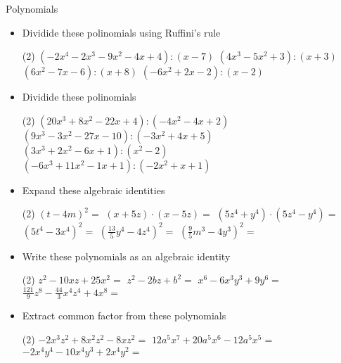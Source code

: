 \documentclass[a4paper]{article}
\begin{document}
     \begin{itemize}
  \begin{section}{Polynomials}
  \begin{itemize}
    \item Dividide these polinomials using Ruffini's rule
    \begin{tasks}(2)
      \task $\left(-2 x^{4} -2 x^{3} -9 x^{2} -4 x + 4 \right) : \left( x -7 \right)$
      \task $\left(4 x^{3} -5 x^{2}  + 3 \right) : \left( x + 3 \right)$
      \task $\left(6 x^{2} -7 x -6 \right) : \left( x + 8 \right)$
      \task $\left(-6 x^{2} + 2 x -2 \right) : \left( x -2 \right)$
    \end{tasks}
    \item Dividide these polinomials
    \begin{tasks}(2)
      \task $\left(20 x^{3} + 8 x^{2} -22 x + 4 \right) : \left(-4 x^{2} -4 x + 2 \right)$
      \task $\left(9 x^{3} -3 x^{2} -27 x -10 \right) : \left(-3 x^{2} + 4 x + 5 \right)$
      \task $\left(3 x^{3} + 2 x^{2} -6 x + 1 \right) : \left( x^{2}  -2 \right)$
      \task $\left(-6 x^{3} + 11 x^{2} -1 x + 1 \right) : \left(-2 x^{2} +  x + 1 \right)$
    \end{tasks}
    \item Expand these algebraic identities
    \begin{tasks}(2)
      \task $\left(t - 4 m\right)^2 = {}$
      \task $\left(x + 5 z\right) \cdot \left(x - 5 z\right) = {}$
      \task $\left(5 z^{4} + y^{4}\right) \cdot \left(5 z^{4} - y^{4}\right) = {}$
      \task $\left(5 t^{4} - 3 x^{4}\right)^2 = {}$
      \task $\left(\frac{13}{5} y^{4} - 4 z^{4}\right)^2 = {}$
      \task $\left(\frac{9}{5} m^{3} - 4 y^{3}\right)^2 = {}$
    \end{tasks}
    \item Write these polynomials as an algebraic identity
    \begin{tasks}(2)
      \task $z^{2} -10 x z +25 x^{2} = {}$
      \task $z^{2} -2 b z +b^{2} = {}$
      \task $x^{6} -6 x^{3} y^{3} +9 y^{6} = {}$
      \task $\frac{121}{9} z^{8} -\frac{44}{3} x^{4} z^{4} +4 x^{8} = {}$
    \end{tasks}
    \item Extract common factor from these polynomials
    \begin{tasks}(2)
      \task $-2 x^{3} z^{2} +8 x^{2} z^{2} -8 x z^{2} = {}$
      \task $12 a^{5} x^{7} +20 a^{5} x^{6} -12 a^{5} x^{5} = {}$
      \task $-2 x^{4} y^{4} -10 x^{4} y^{3} +2 x^{4} y^{2} = {}$
    \end{tasks}

\end{itemize}
\end{section}
\end{itemize}
\end{document}
